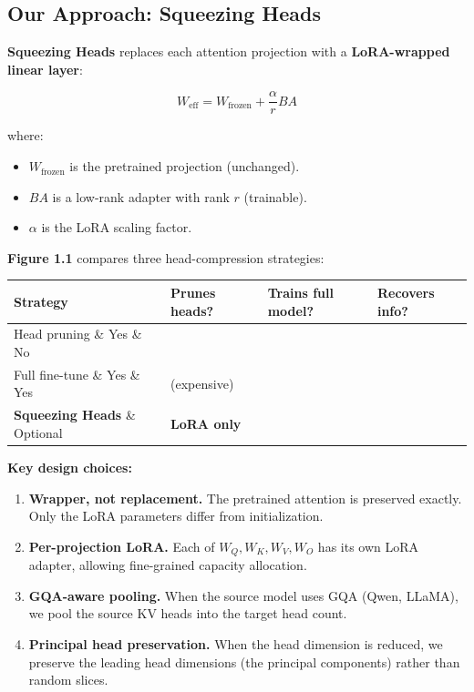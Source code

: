 \subsection{Our Approach: Squeezing Heads}

\textbf{Squeezing Heads} replaces each attention projection with a 
\textbf{LoRA-wrapped linear layer}:

\begin{equation}
W_\text{eff} = W_\text{frozen} + \frac{\alpha}{r} B A
\end{equation}

where:
\begin{itemize}
\item $W_\text{frozen}$ is the pretrained projection (unchanged).
\item $B A$ is a low-rank adapter with rank $r$ (trainable).
\item $\alpha$ is the LoRA scaling factor.

\end{itemize}
\textbf{Figure 1.1} compares three head-compression strategies:

\begin{table}[H]
\centering
\small
\begin{tabular}{llll}
\toprule
\textbf{Strategy} & \textbf{Prunes heads?} & \textbf{Trains full model?} & \textbf{Recovers info?} \\
\midrule
Head pruning \& Yes \& No &  \\
Full fine-tune \& Yes \& Yes & (expensive) \\
\textbf{Squeezing Heads} \& Optional & \textbf{LoRA only} &  \\
\bottomrule
\end{tabular}
\end{table}

\textbf{Key design choices:}

\begin{enumerate}
\item \textbf{Wrapper, not replacement.} The pretrained attention is preserved
  exactly. Only the LoRA parameters differ from initialization.
\item \textbf{Per-projection LoRA.} Each of $W_Q, W_K, W_V, W_O$ has its own LoRA
  adapter, allowing fine-grained capacity allocation.
\item \textbf{GQA-aware pooling.} When the source model uses GQA (Qwen, LLaMA),
  we pool the source KV heads into the target head count.
\item \textbf{Principal head preservation.} When the head dimension is reduced, we
  preserve the leading head dimensions (the principal components) rather
  than random slices.

\end{enumerate}
